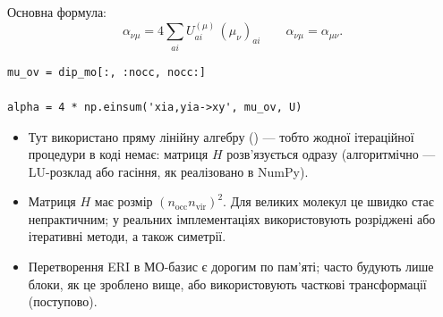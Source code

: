 Основна формула:
\[
	\alpha_{\nu\mu}
	=  4 \sum_{ai}
	U^{(\mu)}_{ai}\, (\mu_\nu)_{ai}
	\qquad
	\alpha_{\nu\mu} = \alpha_{\mu\nu}.
\]

\begin{verbatim}
mu_ov = dip_mo[:, :nocc, nocc:]

alpha = 4 * np.einsum('xia,yia->xy', mu_ov, U)
\end{verbatim}

\begin{commentbox}
	\begin{itemize}
		\item  Тут використано пряму лінійну алгебру () --- тобто жодної ітераційної процедури в коді немає: матриця \(H\) розв'язується одразу (алгоритмічно --- LU-розклад або гасіння, як реалізовано в NumPy).
		\item Матриця \(H\) має розмір \((n_\text{occ} n_\text{vir})^2\). Для великих молекул це швидко стає непрактичним; у реальних імплементаціях використовують розріджені або ітеративні методи, а також симетрії.
		\item Перетворення ERI в МО-базис є дорогим по пам'яті; часто будують лише блоки, як це зроблено вище, або використовують часткові трансформації (поступово).
	\end{itemize}
\end{commentbox}



%
%
%
%
%
%


